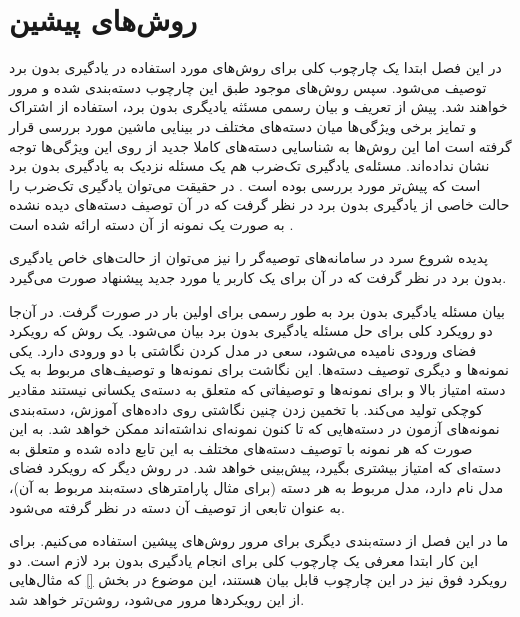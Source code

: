 \chapter{روش‌های پیشین} \label{chap:lr}
در این فصل ابتدا یک چارچوب کلی برای روش‌های مورد استفاده در یادگیری بدون برد توصیف می‌شود. سپس روش‌های موجود طبق این چارچوب دسته‌بندی شده و مرور خواهند شد. پیش از تعریف و بیان رسمی مسئثه یادیگری بدون برد، استفاده از اشتراک و تمایز برخی ویژگی‌ها میان دسته‌های مختلف در بینایی ماشین مورد بررسی قرار گرفته است
\cite{BakkerH03, TsochantaridisJHA05, ulman2005}
اما این روش‌ها به شناسایی دسته‌های کاملا جدید از روی این ویژگی‌ها توجه نشان نداده‌اند.
مسئله‌ی یادگیری تک‌ضرب
هم یک مسئله نزدیک به یادگیری بدون برد است که پیش‌تر مورد بررسی بوده است
\cite{miller12}.
در حقیقت می‌توان یادگیری تک‌ضرب را حالت خاصی از یادگیری بدون برد در نظر گرفت که در آن توصیف دسته‌های دیده نشده به صورت یک نمونه از آن دسته ارائه شده است
\cite{bengio08}.

 پدیده شروع سرد
 در سامانه‌های توصیه‌گر
 را نیز می‌توان از حالت‌های خاص یادگیری بدون برد در نظر گرفت که در آن برای یک کاربر یا مورد جدید پیشنهاد صورت می‌گیرد.


بیان مسئله  یادگیری بدون برد به طور رسمی برای اولین بار در
\cite{bengio08}
صورت گرفت. در آن‌جا دو رویکرد کلی برای حل مسئله یادگیری بدون برد بیان می‌شود. یک روش که رویکرد فضای ورودی
نامیده می‌شود، سعی در مدل کردن نگاشتی با دو ورودی دارد. یکی نمونه‌ها و دیگری توصیف دسته‌ها. این نگاشت برای نمونه‌ها و توصیف‌های مربوط به یک دسته امتیاز بالا و برای نمونه‌ها و توصیفاتی که متعلق به دسته‌ی یکسانی نیستند مقادیر کوچکی تولید می‌کند. با تخمین زدن چنین نگاشتی روی داده‌های آموزش، دسته‌بندی نمونه‌های آزمون در دسته‌هایی که تا کنون نمونه‌ای نداشته‌اند ممکن خواهد شد. به این صورت که هر نمونه با توصیف دسته‌های مختلف به این تابع داده شده و متعلق به دسته‌ای که امتیاز بیشتری بگیرد، پیش‌بینی خواهد شد.
در روش دیگر که رویکرد فضای مدل
نام دارد، مدل مربوط به هر دسته (برای مثال پارامترهای دسته‌بند مربوط به آن)، به عنوان تابعی از توصیف آن دسته در نظر گرفته می‌شود.

ما در این فصل از دسته‌بندی دیگری برای مرور روش‌های پیشین استفاده می‌کنیم. برای این کار ابتدا معرفی یک چارچوب کلی برای انجام یادگیری بدون برد لازم است. دو رویکرد فوق نیز در این چارچوب قابل بیان هستند، این موضوع در بخش \ref{} که مثال‌هایی از این رویکردها مرور می‌شود، روشن‌تر خواهد شد.

